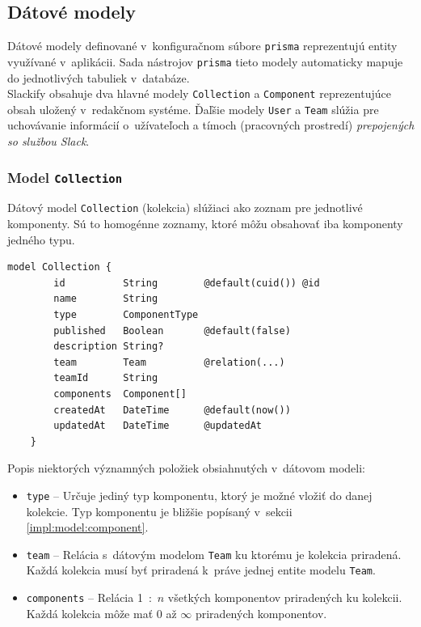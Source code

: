 \subsection{Dátové modely}
\label{impl:data_models}
Dátové modely definované v~konfiguračnom súbore \texttt{prisma} reprezentujú entity využívané v~aplikácii. Sada nástrojov \texttt{prisma} tieto modely automaticky mapuje do jednotlivých tabuliek v~databáze. \\

\noindent Slackify obsahuje dva hlavné modely \texttt{Collection} a \texttt{Component} reprezentujúce obsah uložený v~redakčnom systéme. Ďaľšie modely \texttt{User} a \texttt{Team} slúžia pre uchovávanie informácií o~užívateľoch a tímoch (pracovných prostredí) \emph{prepojených so službou Slack}.

\subsubsection{Model \texttt{Collection}}
Dátový model \texttt{Collection} (kolekcia) slúžiaci ako zoznam pre jednotlivé komponenty. Sú to homogénne zoznamy, ktoré môžu obsahovať iba komponenty jedného typu. \\

\begin{lstlisting}[language={Prisma}, caption=Dátový model \texttt{Collection} v~konfiguračnom súbore \texttt{prisma}.]
	model Collection {
		id          String        @default(cuid()) @id
		name        String
		type        ComponentType
		published   Boolean       @default(false)
		description String?
		team        Team          @relation(...)
		teamId      String
		components  Component[]
		createdAt   DateTime      @default(now())
		updatedAt   DateTime      @updatedAt
	}
\end{lstlisting}

\medskip

\noindent Popis niektorých významných položiek obsiahnutých v~dátovom modeli:

\begin{itemize}
	\item \texttt{type} -- Určuje jediný typ komponentu, ktorý je možné vložiť do danej kolekcie. Typ komponentu je bližšie popísaný v~sekcii \ref{impl:model:component}.
	\item \texttt{team} -- Relácia s~dátovým modelom \texttt{Team} ku ktorému je kolekcia priradená. Každá kolekcia musí byť priradená k~práve jednej entite modelu \texttt{Team}.
	\item \texttt{components} -- Relácia 1~:~$n$ všetkých komponentov priradených ku kolekcii. Každá kolekcia môže mať 0 až $\infty$ priradených komponentov.
\end{itemize}

